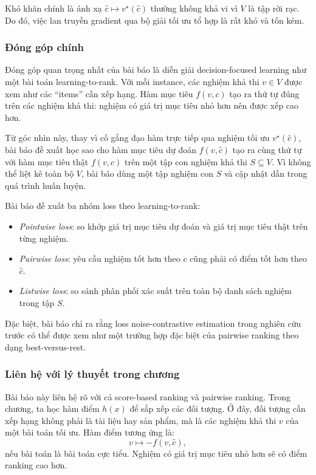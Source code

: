Khó khăn chính là ánh xạ \(\hat{c}\mapsto v^\star(\hat{c})\) thường không khả vi vì \(V\) là tập rời rạc. Do đó, việc lan truyền gradient qua bộ giải tối ưu tổ hợp là rất khó và tốn kém.

\subsubsection{Đóng góp chính}

Đóng góp quan trọng nhất của bài báo là diễn giải decision-focused learning như một bài toán learning-to-rank. Với mỗi instance, các nghiệm khả thi \(v\in V\) được xem như các ``items'' cần xếp hạng. Hàm mục tiêu \(f(v,c)\) tạo ra thứ tự đúng trên các nghiệm khả thi: nghiệm có giá trị mục tiêu nhỏ hơn nên được xếp cao hơn.

Từ góc nhìn này, thay vì cố gắng đạo hàm trực tiếp qua nghiệm tối ưu \(v^\star(\hat{c})\), bài báo đề xuất học sao cho hàm mục tiêu dự đoán \(f(v,\hat{c})\) tạo ra cùng thứ tự với hàm mục tiêu thật \(f(v,c)\) trên một tập con nghiệm khả thi \(S\subseteq V\). Vì không thể liệt kê toàn bộ \(V\), bài báo dùng một tập nghiệm con \(S\) và cập nhật dần trong quá trình huấn luyện.

Bài báo đề xuất ba nhóm loss theo learning-to-rank:

\begin{itemize}
    \item \textit{Pointwise loss}: so khớp giá trị mục tiêu dự đoán và giá trị mục tiêu thật trên từng nghiệm.
    \item \textit{Pairwise loss}: yêu cầu nghiệm tốt hơn theo \(c\) cũng phải có điểm tốt hơn theo \(\hat{c}\).
    \item \textit{Listwise loss}: so sánh phân phối xác suất trên toàn bộ danh sách nghiệm trong tập \(S\).
\end{itemize}

Đặc biệt, bài báo chỉ ra rằng loss noise-contrastive estimation trong nghiên cứu trước có thể được xem như một trường hợp đặc biệt của pairwise ranking theo dạng best-versus-rest.

\subsubsection{Liên hệ với lý thuyết trong chương}

Bài báo này liên hệ rõ với cả score-based ranking và pairwise ranking. Trong chương, ta học hàm điểm \(h(x)\) để sắp xếp các đối tượng. Ở đây, đối tượng cần xếp hạng không phải là tài liệu hay sản phẩm, mà là các nghiệm khả thi \(v\) của một bài toán tối ưu. Hàm điểm tương ứng là:
\[
    v \mapsto -f(v,\hat{c}),
\]
nếu bài toán là bài toán cực tiểu. Nghiệm có giá trị mục tiêu nhỏ hơn sẽ có điểm ranking cao hơn.

